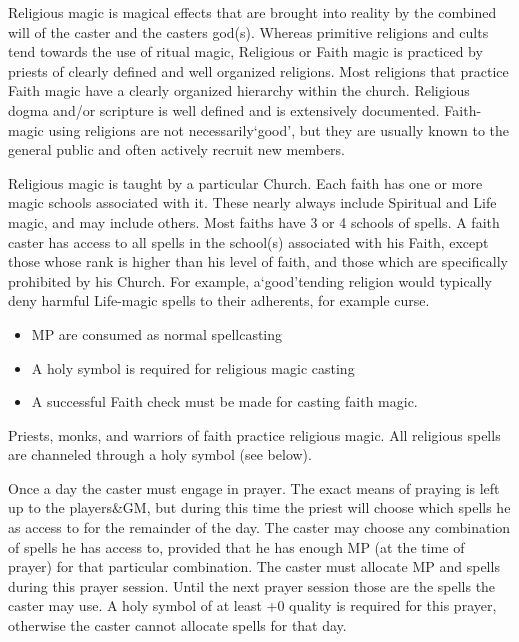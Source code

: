 \documentclass[twoside]{book}
\begin{document}
    {  
    Religious magic is magical effects that are brought into reality by the combined will of the caster and the casters god(s). Whereas primitive religions and cults tend towards the use of ritual magic, Religious or Faith magic is practiced by priests of clearly defined and well organized religions. Most religions that practice Faith magic have a clearly organized hierarchy within the church. Religious dogma and/or scripture is well defined and is extensively documented. Faith-magic using religions are not necessarily`good', but they are usually known to the general public and often actively recruit new members.
    }
  
    {  
    Religious magic is taught by a particular Church. Each faith has one or more magic schools associated with it. These nearly always include Spiritual and Life magic, and may include others. Most faiths have 3 or 4 schools of spells. A faith caster has access to all spells in the school(s) associated with his Faith, except those whose rank is higher than his level of faith, and those which are specifically prohibited by his Church. For example, a`good'tending religion would typically deny harmful Life-magic spells to their adherents, for example curse.
    }
  
\begin{itemize}
      
  \item MP are consumed as normal spellcasting
  \item A holy symbol is required for religious magic casting
  \item A successful Faith check must be made for casting faith magic.
\end{itemize}
  
    {  
    Priests, monks, and warriors of faith practice religious magic. All religious spells are channeled through a holy symbol (see below).
    }
  
    {  
    Once a day the caster must engage in prayer. The exact means of praying is left up to the players\&GM, but during this time the priest will choose which spells he as access to for the remainder of the day. The caster may choose any combination of spells he has access to, provided that he has enough MP (at the time of prayer) for that particular combination. The caster must allocate MP and spells during this prayer session. Until the next prayer session those are the spells the caster may use. A holy symbol of at least +0 quality is required for this prayer, otherwise the caster cannot allocate spells for that day.
    }
  
\end{document}
